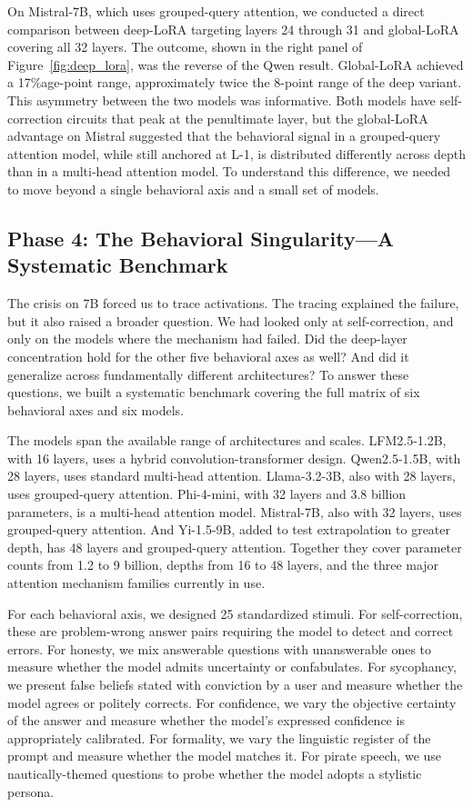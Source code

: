 \documentclass[11pt,a4paper]{article}
\begin{document}
On Mistral-7B, which uses grouped-query attention, we conducted a direct comparison between deep-LoRA targeting layers 24 through 31 and global-LoRA covering all 32 layers. The outcome, shown in the right panel of Figure~\ref{fig:deep_lora}, was the reverse of the Qwen result. Global-LoRA achieved a 17\%age-point range, approximately twice the 8-point range of the deep variant. This asymmetry between the two models was informative. Both models have self-correction circuits that peak at the penultimate layer, but the global-LoRA advantage on Mistral suggested that the behavioral signal in a grouped-query attention model, while still anchored at L-1, is distributed differently across depth than in a multi-head attention model. To understand this difference, we needed to move beyond a single behavioral axis and a small set of models.

\subsection{Phase 4: The Behavioral Singularity---A Systematic Benchmark}

The crisis on 7B forced us to trace activations. The tracing explained the failure, but it also raised a broader question. We had looked only at self-correction, and only on the models where the mechanism had failed. Did the deep-layer concentration hold for the other five behavioral axes as well? And did it generalize across fundamentally different architectures? To answer these questions, we built a systematic benchmark covering the full matrix of six behavioral axes and six models.

The models span the available range of architectures and scales. LFM2.5-1.2B, with 16 layers, uses a hybrid convolution-transformer design. Qwen2.5-1.5B, with 28 layers, uses standard multi-head attention. Llama-3.2-3B, also with 28 layers, uses grouped-query attention. Phi-4-mini, with 32 layers and 3.8 billion parameters, is a multi-head attention model. Mistral-7B, also with 32 layers, uses grouped-query attention. And Yi-1.5-9B, added to test extrapolation to greater depth, has 48 layers and grouped-query attention. Together they cover parameter counts from 1.2 to 9 billion, depths from 16 to 48 layers, and the three major attention mechanism families currently in use.

For each behavioral axis, we designed 25 standardized stimuli. For self-correction, these are problem-wrong answer pairs requiring the model to detect and correct errors. For honesty, we mix answerable questions with unanswerable ones to measure whether the model admits uncertainty or confabulates. For sycophancy, we present false beliefs stated with conviction by a user and measure whether the model agrees or politely corrects. For confidence, we vary the objective certainty of the answer and measure whether the model's expressed confidence is appropriately calibrated. For formality, we vary the linguistic register of the prompt and measure whether the model matches it. For pirate speech, we use nautically-themed questions to probe whether the model adopts a stylistic persona.
\end{document}
